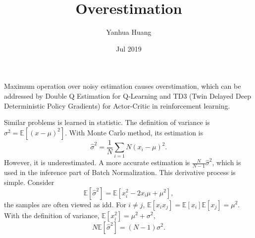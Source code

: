 \documentclass[a4paper,11pt]{article}
\begin{document}
\title{Overestimation}
\author{Yanhua Huang}
\date{Jul 2019}
\maketitle

Maximum operation over noisy estimation causes overstimation, which can be addressed by Double Q Estimation for Q-Learning and TD3 (Twin Delayed Deep Deterministic Policy Gradients) for Actor-Critic in reinforcement learning.

Similar problems is learned in statistic. The definition of variance is $\sigma^2 = \mathbb{E}[{(x - \mu)}^2]$. With Monte Carlo method, its estimation is 
\begin{equation}
\hat{\sigma}^2 = \frac{1}{N}\sum_{i=1}{N}{(x_i - \mu)}^2.
\end{equation}
However, it is underestimated. A more accurate estimation is $\frac{N}{N-1}\hat{\sigma}^2$, which is used in the inference part of Batch Normalization. This derivative process is simple. Consider 
\begin{equation}
\mathbb{E}[\hat{\sigma}^2] = \mathbb{E}[x_i^2 - 2x_i\mu + \mu^2], 
\end{equation}
the samples are often viewed as idd. For $i \neq j$, $\mathbb{E}[x_ix_j] = \mathbb{E}[x_i]\mathbb{E}[x_j] = \mu^2$. With the definition of variance, $\mathbb{E}[x_i^2] = \mu^2 + \sigma^2$,
\begin{equation}
N\mathbb{E}[\hat{\sigma}^2] = (N-1)\sigma^2.
\end{equation}
\end{document}
